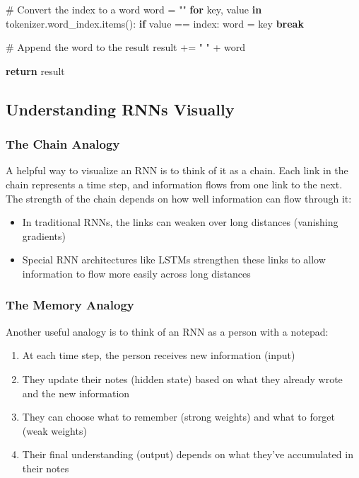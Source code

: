 \documentclass[
  letterpaper,
  DIV=11,
  numbers=noendperiod]{scrreprt}
\newenvironment{Shaded}{\begin{snugshade}}{\end{snugshade}}
\newcommand{\CommentTok}[1]{\textcolor[rgb]{0.37,0.37,0.37}{#1}}
\newcommand{\ControlFlowTok}[1]{\textcolor[rgb]{0.00,0.23,0.31}{\textbf{#1}}}
\newcommand{\KeywordTok}[1]{\textcolor[rgb]{0.00,0.23,0.31}{\textbf{#1}}}
\newcommand{\NormalTok}[1]{\textcolor[rgb]{0.00,0.23,0.31}{#1}}
\newcommand{\OperatorTok}[1]{\textcolor[rgb]{0.37,0.37,0.37}{#1}}
\newcommand{\StringTok}[1]{\textcolor[rgb]{0.13,0.47,0.30}{#1}}
\providecommand{\tightlist}{%
  \setlength{\itemsep}{0pt}\setlength{\parskip}{0pt}}\usepackage{longtable,booktabs,array}
\begin{document}
\begin{Shaded}
\begin{Highlighting}[]
        \CommentTok{\# Convert the index to a word}
\NormalTok{        word }\OperatorTok{=} \StringTok{""}
        \ControlFlowTok{for}\NormalTok{ key, value }\KeywordTok{in}\NormalTok{ tokenizer.word\_index.items():}
            \ControlFlowTok{if}\NormalTok{ value }\OperatorTok{==}\NormalTok{ index:}
\NormalTok{                word }\OperatorTok{=}\NormalTok{ key}
                \ControlFlowTok{break}
        
        \CommentTok{\# Append the word to the result}
\NormalTok{        result }\OperatorTok{+=} \StringTok{" "} \OperatorTok{+}\NormalTok{ word}
    
    \ControlFlowTok{return}\NormalTok{ result}
\end{Highlighting}
\end{Shaded}

\subsection{Understanding RNNs
Visually}\label{understanding-rnns-visually}

\subsubsection{The Chain Analogy}\label{the-chain-analogy}

A helpful way to visualize an RNN is to think of it as a chain. Each
link in the chain represents a time step, and information flows from one
link to the next. The strength of the chain depends on how well
information can flow through it:

\begin{itemize}
\tightlist
\item
  In traditional RNNs, the links can weaken over long distances
  (vanishing gradients)
\item
  Special RNN architectures like LSTMs strengthen these links to allow
  information to flow more easily across long distances
\end{itemize}

\subsubsection{The Memory Analogy}\label{the-memory-analogy}

Another useful analogy is to think of an RNN as a person with a notepad:

\begin{enumerate}
\def\labelenumi{\arabic{enumi}.}
\tightlist
\item
  At each time step, the person receives new information (input)
\item
  They update their notes (hidden state) based on what they already
  wrote and the new information
\item
  They can choose what to remember (strong weights) and what to forget
  (weak weights)
\item
  Their final understanding (output) depends on what they've accumulated
  in their notes
\end{enumerate}
\end{document}
